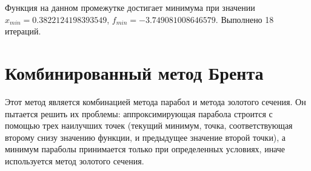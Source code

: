 \documentclass[12pt]{article}
\begin{document}
Функция на данном промежутке достигает минимума при значении $x_{min} = 0.3822124198393549$, $f_{min} = -3.749081008646579$. Выполнено 18 итераций.

\newpage
\section{Комбинированный метод Брента}

Этот метод является комбинацией метода парабол и метода золотого сечения. Он пытается решить их проблемы: аппроксимирующая парабола строится с помощью трех наилучших точек (текущий минимум, точка, соответствующая второму снизу значению функции, и предыдущее значение второй точки), а минимум параболы принимается только при определенных условиях, иначе используется метод золотого сечения. 
\end{document}
